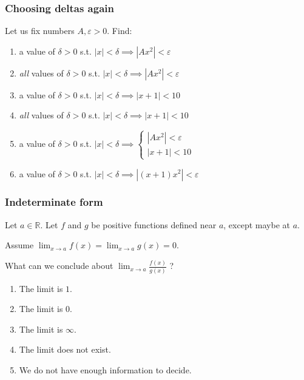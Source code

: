 \documentclass[14pt]{beamer}
\newcommand {\DS} [1] {${\displaystyle #1}$}
\newcommand {\R}{\mathbb{R}}
\newcommand{\e}{\varepsilon}
\newcommand{\p}{\pause}
\begin{document}
\begin{frame}[t]
\frametitle{Choosing deltas again} 

Let us fix numbers $A, \e >0$.  Find:

\vfill

\begin{enumerate}
	\item  a value of $\delta >0$ \; s.t.  \hfill \DS{|x|< \delta \implies |Ax^2|<\e}
\p \vfill
	\item  \emph{all} values of $\delta >0$ \; s.t.  \hfill \DS{|x|< \delta \implies |Ax^2|<\e}
\p \vfill
	\item a value of $\delta >0$ \; s.t.   \hfill \DS{|x|< \delta \implies |x+1| < 10}
\p \vfill
	\item \emph{all} values of $\delta >0$ \; s.t.   \hfill \DS{|x|< \delta \implies |x+1| < 10}
\p \vfill
	\item a value of $\delta >0$  \; s.t.   \hfill \DS{|x|< \delta \implies \left\{  \begin{array}{c} |Ax^2|<\e \\ |x+1| < 10 \end{array} \right. }
\p \vfill
	\item a value of $\delta >0$ \; s.t. \hfill \DS{|x| < \delta \implies |(x+1)x^2| < \e }
\vfill
\end{enumerate}

\end{frame}

\begin{frame}[t]
\frametitle{Indeterminate form}


Let $a \in \R$. 
Let $f$ and $g$ be positive functions defined near $a$, except maybe at $a$. 

\vfill

Assume 
	\DS{
		\lim_{x \to a} f(x) = \lim_{x \to a} g(x) = 0
	}.

\vfill

What can we conclude about  \quad
	\DS{
		\lim_{x \to a} \frac{f(x)}{g(x)} 
	} ?

\vfill

\begin{multicols}{2}
\begin{enumerate}
	\item The limit is $1$.
	\item The limit is $0$.
	\item The limit is $\infty$.
	\item The limit does not exist.
	\item  We do not have enough information to decide.
\end{enumerate}
\end{multicols}

\end{frame}
\end{document}
